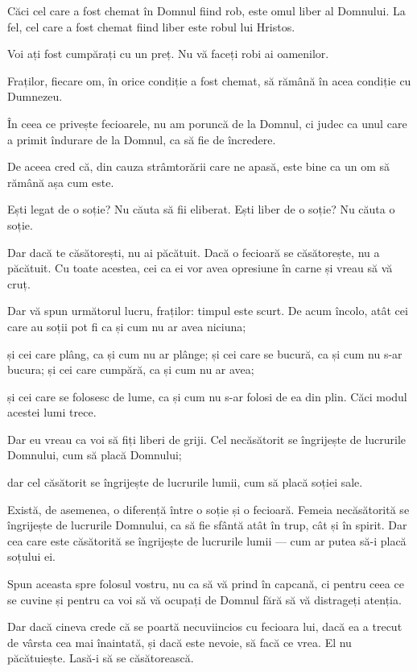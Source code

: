 {Căci cel care a fost chemat în Domnul fiind rob, este omul liber al Domnului. La fel, cel care a fost chemat fiind liber este robul lui Hristos.

Voi ați fost cumpărați cu un preț. Nu vă faceți robi ai oamenilor.

Fraților, fiecare om, în orice condiție a fost chemat, să rămână în acea condiție cu Dumnezeu.


\par }{\PP {}În ceea ce privește fecioarele, nu am poruncă de la Domnul, ci judec ca unul care a primit îndurare de la Domnul, ca să fie de încredere.

De aceea cred că, din cauza strâmtorării care ne apasă, este bine ca un om să rămână așa cum este.

Ești legat de o soție? Nu căuta să fii eliberat. Ești liber de o soție? Nu căuta o soție.

Dar dacă te căsătorești, nu ai păcătuit. Dacă o fecioară se căsătorește, nu a păcătuit. Cu toate acestea, cei ca ei vor avea opresiune în carne și vreau să vă cruț.

Dar vă spun următorul lucru, fraților: timpul este scurt. De acum încolo, atât cei care au soții pot fi ca și cum nu ar avea niciuna;

și cei care plâng, ca și cum nu ar plânge; și cei care se bucură, ca și cum nu s-ar bucura; și cei care cumpără, ca și cum nu ar avea;

și cei care se folosesc de lume, ca și cum nu s-ar folosi de ea din plin. Căci modul acestei lumi trece.


\par }{\PP {}Dar eu vreau ca voi să fiți liberi de griji. Cel necăsătorit se îngrijește de lucrurile Domnului, cum să placă Domnului;

dar cel căsătorit se îngrijește de lucrurile lumii, cum să placă soției sale.

Există, de asemenea, o diferență între o soție și o fecioară. Femeia necăsătorită se îngrijește de lucrurile Domnului, ca să fie sfântă atât în trup, cât și în spirit. Dar cea care este căsătorită se îngrijește de lucrurile lumii — cum ar putea să-i placă soțului ei.

Spun aceasta spre folosul vostru, nu ca să vă prind în capcană, ci pentru ceea ce se cuvine și pentru ca voi să vă ocupați de Domnul fără să vă distrageți atenția.


\par }{\PP {}Dar dacă cineva crede că se poartă necuviincios cu fecioara lui, dacă ea a trecut de vârsta cea mai înaintată, și dacă este nevoie, să facă ce vrea. El nu păcătuiește. Lasă-i să se căsătorească.

}
